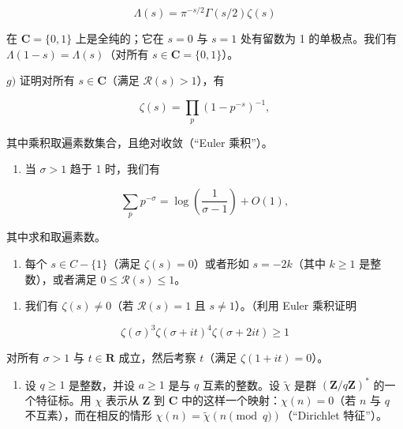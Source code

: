 \[
\Lambda (s) = \pi^ {- s / 2} \Gamma (s / 2) \zeta (s)
\]

在 \(\mathbf{C} = \{0,1\}\) 上是全纯的；它在 \(s = 0\) 与 \(s = 1\) 处有留数为 1 的单极点。我们有 \(\Lambda(1 - s) = \Lambda(s)\)（对所有 \(s \in \mathbf{C} = \{0,1\}\)）。

\(g)\) 证明对所有 \(s \in \mathbf{C}\)（满足 \(\mathcal{R}(s) > 1\)），有

\[
\zeta (s) = \prod_ {p} (1 - p ^ {- s}) ^ {- 1},
\]

其中乘积取遍素数集合，且绝对收敛（“Euler 乘积”）。

\begin{enumerate}
\def\labelenumi{\alph{enumi})}
\setcounter{enumi}{7}
\tightlist
\item
  当 \(\sigma > 1\) 趋于 1 时，我们有
\end{enumerate}

\[
\sum_ {p} p ^ {- \sigma} = \log \left(\frac {1}{\sigma - 1}\right) + O (1),
\]

其中求和取遍素数。

\begin{enumerate}
\def\labelenumi{\roman{enumi})}
\tightlist
\item
  每个 \(s \in C - \{1\}\)（满足 \(\zeta(s) = 0\)）或者形如 \(s = -2k\)（其中 \(k \geqslant 1\) 是整数），或者满足 \(0 \leqslant \mathcal{R}(s) \leqslant 1\)。
\end{enumerate}

\begin{enumerate}
\def\labelenumi{\alph{enumi})}
\setcounter{enumi}{9}
\tightlist
\item
  我们有 \(\zeta(s) \neq 0\)（若 \(\mathcal{R}(s) = 1\) 且 \(s \neq 1\)）。（利用 Euler 乘积证明
\end{enumerate}

\[
\zeta (\sigma) ^ {3} \zeta (\sigma + i t) ^ {4} \zeta (\sigma + 2 i t) \geqslant 1
\]

对所有 \(\sigma > 1\) 与 \(t \in \mathbf{R}\) 成立，然后考察 \(t\)（满足 \(\zeta(1 + it) = 0\)）。

\begin{enumerate}
\def\labelenumi{\arabic{enumi})}
\setcounter{enumi}{16}
\tightlist
\item
  设 \(q \geqslant 1\) 是整数，并设 \(a \geqslant 1\) 是与 \(q\) 互素的整数。设 \(\widetilde{\chi}\) 是群 \((\mathbf{Z}/q\mathbf{Z})^*\) 的一个特征标。用 \(\chi\) 表示从 \(\mathbf{Z}\) 到 \(\mathbf{C}\) 中的这样一个映射：\(\chi(n) = 0\)（若 \(n\) 与 \(q\) 不互素），而在相反的情形 \(\chi(n) = \widetilde{\chi}(n \pmod{q})\)（“Dirichlet 特征”）。
\end{enumerate}

